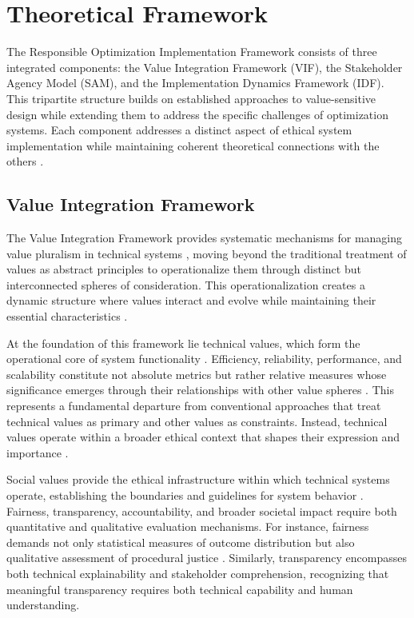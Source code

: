 \documentclass[12pt]{article}
\begin{document}
\section{Theoretical Framework}

The Responsible Optimization Implementation Framework consists of three integrated components: the Value Integration Framework (VIF), the Stakeholder Agency Model (SAM), and the Implementation Dynamics Framework (IDF). This tripartite structure builds on established approaches to value-sensitive design \parencite{friedman2008,vandenhoven2013} while extending them to address the specific challenges of optimization systems. Each component addresses a distinct aspect of ethical system implementation while maintaining coherent theoretical connections with the others \parencite{dignum2019}.

\subsection{Value Integration Framework}

The Value Integration Framework provides systematic mechanisms for managing value pluralism in technical systems \parencite{vandepoel2013}, moving beyond the traditional treatment of values as abstract principles to operationalize them through distinct but interconnected spheres of consideration. This operationalization creates a dynamic structure where values interact and evolve while maintaining their essential characteristics \parencite{manders2011}.

At the foundation of this framework lie technical values, which form the operational core of system functionality \parencite{introna2007}. Efficiency, reliability, performance, and scalability constitute not absolute metrics but rather relative measures whose significance emerges through their relationships with other value spheres \parencite{simon2015}. This represents a fundamental departure from conventional approaches that treat technical values as primary and other values as constraints. Instead, technical values operate within a broader ethical context that shapes their expression and importance \parencite{orlikowski2007}.

Social values provide the ethical infrastructure within which technical systems operate, establishing the boundaries and guidelines for system behavior \parencite{barocas2016}. Fairness, transparency, accountability, and broader societal impact require both quantitative and qualitative evaluation mechanisms. For instance, fairness demands not only statistical measures of outcome distribution but also qualitative assessment of procedural justice \parencite{pasquale2015}. Similarly, transparency encompasses both technical explainability and stakeholder comprehension, recognizing that meaningful transparency requires both technical capability and human understanding.
\end{document}
